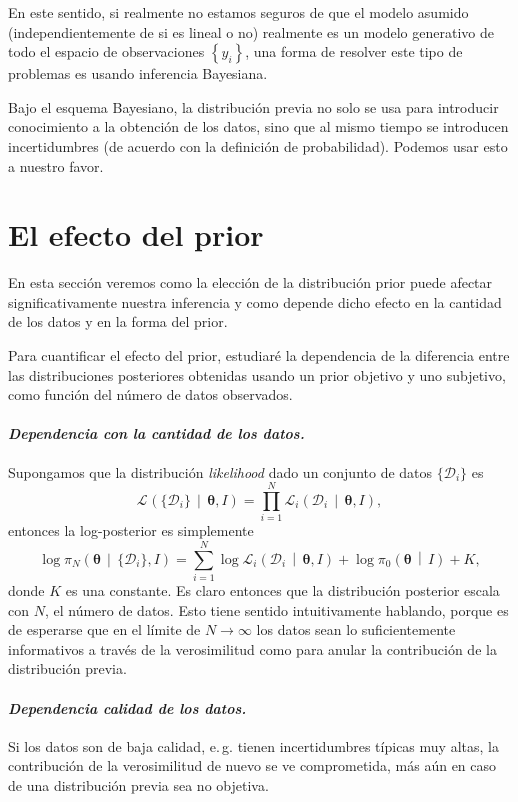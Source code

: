\documentclass[a4paper,twoside]{article}
\newcommand{\hip}{\ensuremath{\mathbold{\theta}}\xspace}
\newcommand{\dat}[1][i]{\ensuremath{\{\mathcal{D}_{#1}\}}\xspace}
\newcommand{\pos}[2]{\ensuremath{\pi_N\left(#1\,\middle|\, #2\right)}\xspace}
\newcommand{\pri}[2]{\ensuremath{\pi_0\left(#1\,\middle|\, #2\right)}\xspace}
\newcommand{\lik}[3][]{\ensuremath{\mathcal{L}_{#1}\left(#2\,\middle|\, #3\right)}\xspace}
\newcommand{\set}[1]{\ensuremath{\left\{#1\right\}}\xspace}
\begin{document}
En este sentido, si realmente no estamos seguros de que el modelo asumido (independientemente de si
es lineal o no) realmente es un modelo generativo de todo el espacio de observaciones $\set{y_i}$,
una forma de resolver este tipo de problemas es usando inferencia Bayesiana.

Bajo el esquema Bayesiano, la distribución previa no solo se usa para introducir conocimiento
a la obtención de los datos, sino que al mismo tiempo se introducen incertidumbres (de acuerdo con
la definición de probabilidad). Podemos usar esto a nuestro favor.


\section*{El efecto del prior}
%
En esta sección veremos como la elección de la distribución prior puede afectar significativamente
nuestra inferencia y como depende dicho efecto en la cantidad de los datos y en la forma del prior.

Para cuantificar el efecto del prior, estudiaré la dependencia de la diferencia entre las
distribuciones posteriores obtenidas usando un prior objetivo y uno subjetivo, como función del
número de datos observados.

\paragraph{\textit{\color{teal}Dependencia con la cantidad de los datos.}} Supongamos que la
distribución \emph{likelihood} dado un conjunto de datos $\dat$ es
%
$$\lik{\dat}{\hip,I} = \prod_{i=1}^N\lik[i]{\mathcal{D}_i}{\hip,I},$$
%
entonces la log-posterior es simplemente
%
$$\log{\pos{\hip}{\dat,I}} = \sum_{i=1}^N\log{\lik[i]{\mathcal{D}_i}{\hip,I}} + \log{\pri{\hip}{I}} + K,$$
%
donde $K$ es una constante. Es claro entonces que la distribución posterior escala con $N$, el
número de datos. Esto tiene sentido intuitivamente hablando, porque es de esperarse que en el límite
de $N\to\infty$ los datos sean lo suficientemente informativos a través de la verosimilitud como
para anular la contribución de la distribución previa.

\paragraph{\textit{\color{teal}Dependencia calidad de los datos.}} Si los datos son de baja calidad,
e.\,g. tienen incertidumbres típicas muy altas, la contribución de la verosimilitud de nuevo se ve
comprometida, más aún en caso de una distribución previa sea no objetiva.
\end{document}
